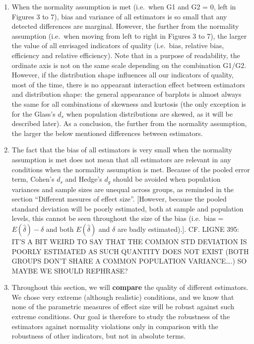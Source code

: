 \documentclass[
  man,floatsintext]{apa6}
\begin{document}
\begin{enumerate}
\def\labelenumi{\arabic{enumi})}
\item
  When the normality assumption is met (i.e.~when G1 and G2 = 0, left in Figures 3 to 7), bias and variance of all estimators is so small that any detected differences are marginal. However, the further from the normality assumption (i.e.~when moving from left to right in Figures 3 to 7), the larger the value of all envisaged indicators of quality (i.e.~bias, relative bias, efficiency and relative efficiency). Note that in a purpose of readability, the ordinate axis is not on the same scale depending on the combination G1/G2. However, if the distribution shape influences all our indicators of quality, most of the time, there is no appearant interaction effect between estimators and distribution shape: the general appearance of barplots is almost always the same for all combinations of skewness and kurtosis (the only exception is for the Glass's \(d_s\) when population distributions are skewed, as it will be described later). As a conclusion, the further from the normality assumption, the larger the below mentioned differences between estimators.
\item
  The fact that the bias of all estimators is very small when the normality assumption is met does not mean that all estimators are relevant in any conditions when the normality assumption is met. Because of the pooled error term, Cohen's \(d_s\) and Hedge's \(d_g\) should be avoided when population variances and sample sizes are unequal across groups, as reminded in the section \enquote{Different mesures of effect size}. {[}However, because the pooled standard deviation will be poorly estimated, both at sample and population levels, this cannot be seen throughout the size of the bias (i.e.~bias = \(E(\hat{\delta})-\delta\) and both \(E(\hat{\delta})\) and \(\delta\) are badly estimated).{]}. CF. LIGNE 395: IT'S A BIT WEIRD TO SAY THAT THE COMMON STD DEVIATION IS POORLY ESTIMATED AS SUCH QUANTITY DOES NOT EXIST (BOTH GROUPS DON'T SHARE A COMMON POPULATION VARIANCE\ldots.) SO MAYBE WE SHOULD REPHRASE?
\item
  Throughout this section, we will \textbf{compare} the quality of different estimators. We chose very extreme (although realistic) conditions, and we know that none of the parametric measures of effect size will be robust against such extreme conditions. Our goal is therefore to study the robustness of the estimators against normality violations only in comparison with the robustness of other indicators, but not in absolute terms.
\end{enumerate}
\end{document}
